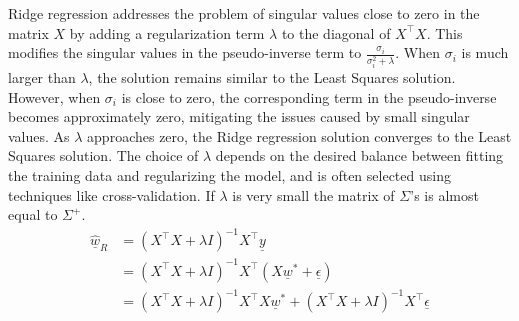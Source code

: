 Ridge regression addresses the problem of singular values close to zero in the matrix $X$ by adding a regularization term $\lambda$ to the diagonal of $X^\intercal X$. This modifies the singular values in the pseudo-inverse term to $\frac{\sigma_i}{\sigma_i^2 + \lambda}$. When $\sigma_i$ is much larger than $\lambda$, the solution remains similar to the Least Squares solution. However, when $\sigma_i$ is close to zero, the corresponding term in the pseudo-inverse becomes approximately zero, mitigating the issues caused by small singular values. As $\lambda$ approaches zero, the Ridge regression solution converges to the Least Squares solution. The choice of $\lambda$ depends on the desired balance between fitting the training data and regularizing the model, and is often selected using techniques like cross-validation.
If $\lambda$ is very small the matrix of $\Sigma$'s is almost equal to $\Sigma^+$.
\[
    \begin{split}
        \underline{\hat{w}}_R &= (X^\intercal X + \lambda I)^{-1} X^\intercal \underline{y}\\
        &= (X^\intercal X + \lambda I)^{-1} X^\intercal(X\underline{w}^* + \underline{\epsilon})\\
        &= (X^\intercal X + \lambda I)^{-1} X^\intercal X\underline{w}^* + (X^\intercal X + \lambda I)^{-1} X^\intercal \underline{\epsilon}\\
    \end{split}    
\]
